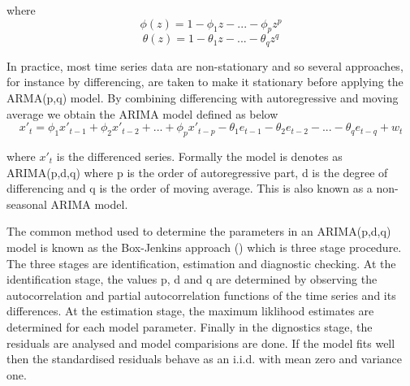 where
        \begin{equation}
            \phi(z) = 1 - \phi_{1}z - ... - \phi_{p}z^{p}
        \end{equation}
        \begin{equation}
            \theta(z) = 1 - \theta_{1}z - ... - \theta_{q}z^{q}
        \end{equation}

In practice, most time series data are non-stationary and so several approaches, for instance
by differencing, are taken to make it stationary before applying the ARMA(p,q) model. By
combining differencing with autoregressive and moving average we obtain the ARIMA model defined
as below
        \begin{equation} \label{eq:arima}
          x'_{t} = \phi_{1}x'_{t-1} + \phi_{2}x'_{t-2} + ... + \phi_{p}x'_{t-p} -
          \theta_{1}e_{t-1} - \theta_{2}e_{t-2} - ... - \theta_{q}e_{t-q} + w_{t}
        \end{equation}

where $x'_{t}$ is the differenced series. Formally the model is denotes as ARIMA(p,d,q) where p
is the order of autoregressive part, d is the degree of differencing and q is the order of moving
average. This is also known as a non-seasonal ARIMA model.

The common method used to determine the parameters in an ARIMA(p,d,q) model is known as the
Box-Jenkins approach (\citet{box2015time}) which is three stage procedure. The three stages are
identification, estimation and diagnostic checking. At the identification stage, the values p, d
and q are determined by observing the autocorrelation and partial autocorrelation functions of
the time series and its differences. At the estimation stage, the maximum liklihood estimates are
determined for each model parameter. Finally in the dignostics stage, the residuals are analysed
and model comparisions are done. If the model fits well then the standardised residuals behave as
an i.i.d. with mean zero and variance one.

